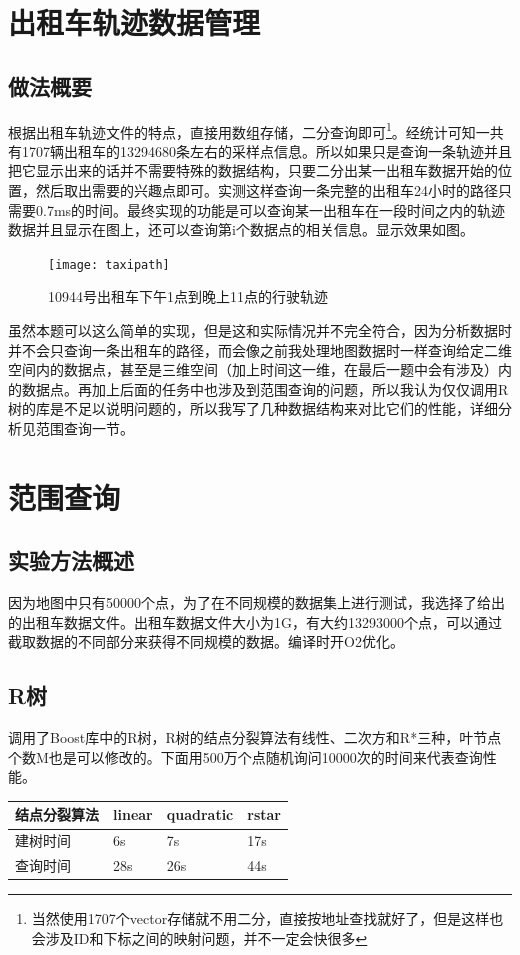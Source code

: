 \documentclass[10pt]{scrartcl}
\begin{document}
\section{出租车轨迹数据管理}
\subsection{做法概要}
根据出租车轨迹文件的特点，直接用数组存储，二分查询即可\footnote{当然使用1707个vector存储就不用二分，直接按地址查找就好了，但是这样也会涉及ID和下标之间的映射问题，并不一定会快很多}。经统计可知一共有1707辆出租车的13294680条左右的采样点信息。所以如果只是查询一条轨迹并且把它显示出来的话并不需要特殊的数据结构，只要二分出某一出租车数据开始的位置，然后取出需要的兴趣点即可。实测这样查询一条完整的出租车24小时的路径只需要0.7ms的时间。最终实现的功能是可以查询某一出租车在一段时间之内的轨迹数据并且显示在图上，还可以查询第i个数据点的相关信息。显示效果如图。

\begin{figure}[htbp] 
\centering\texttt{[image: taxipath]} 
\caption{10944号出租车下午1点到晚上11点的行驶轨迹}\label{fig:2} 
\end{figure} 


虽然本题可以这么简单的实现，但是这和实际情况并不完全符合，因为分析数据时并不会只查询一条出租车的路径，而会像之前我处理地图数据时一样查询给定二维空间内的数据点，甚至是三维空间（加上时间这一维，在最后一题中会有涉及）内的数据点。再加上后面的任务中也涉及到范围查询的问题，所以我认为仅仅调用R树的库是不足以说明问题的，所以我写了几种数据结构来对比它们的性能，详细分析见范围查询一节。

\section{范围查询}
\subsection{实验方法概述}
因为地图中只有50000个点，为了在不同规模的数据集上进行测试，我选择了给出的出租车数据文件。出租车数据文件大小为1G，有大约13293000个点，可以通过截取数据的不同部分来获得不同规模的数据。编译时开O2优化。
\subsection{R树}
调用了Boost库中的R树，R树的结点分裂算法有线性、二次方和R*三种，叶节点个数M也是可以修改的。下面用500万个点随机询问10000次的时间来代表查询性能。

\begin{tabular}{|l|l|l|l|}
\hline
结点分裂算法 & linear & quadratic & rstar \\
\hline
建树时间    &  6s    &  7s       & 17s    \\
\hline
查询时间    &  28s   &  26s      & 44s    \\
\hline
\end{tabular}
\end{document}
